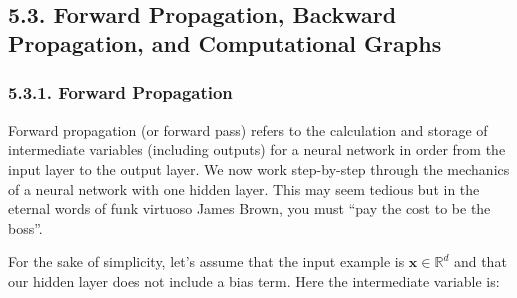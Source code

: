\documentclass[11pt]{article}
\begin{document}
    \begin{center}
    \end{center}
    { \hspace*{\fill} \\}
    
    \begin{center}
    \end{center}
    { \hspace*{\fill} \\}
    
    \begin{center}
    \end{center}
    { \hspace*{\fill} \\}
    
    \begin{center}
    \end{center}
    { \hspace*{\fill} \\}
    
    \subsection*{5.3. Forward Propagation, Backward Propagation, and
Computational
Graphs}\label{forward-propagation-backward-propagation-and-computational-graphs}

    \subsubsection*{5.3.1. Forward Propagation}\label{forward-propagation}

    Forward propagation (or forward pass) refers to the calculation and
storage of intermediate variables (including outputs) for a neural
network in order from the input layer to the output layer. We now work
step-by-step through the mechanics of a neural network with one hidden
layer. This may seem tedious but in the eternal words of funk virtuoso
James Brown, you must ``pay the cost to be the boss''.

For the sake of simplicity, let's assume that the input example is
\(\mathbf{x} \in \mathbb{R}^{d}\) and that our hidden layer does not
include a bias term. Here the intermediate variable is:
\end{document}

